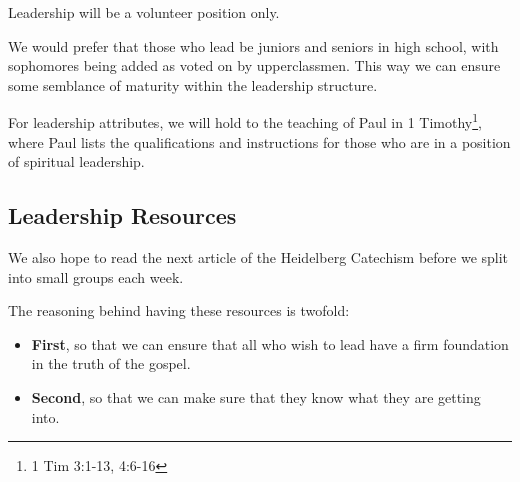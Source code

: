 \documentclass[12pt]{article}
\begin{document}
  Leadership will be a volunteer position only.

  We would prefer that those who lead be juniors and seniors in high school,
with sophomores being added as voted on by upperclassmen. This way we can ensure
some semblance of maturity within the leadership structure.

  For leadership attributes, we will hold to the teaching of Paul in
1 Timothy\footnote{1 Tim 3:1-13, 4:6-16}, where Paul lists the
qualifications and instructions for those who are in a position of spiritual
leadership.

\subsection{Leadership Resources}

%
%
%
%
%

  We also hope to read the next article of the Heidelberg Catechism before we
split into small groups each week.

  The reasoning behind having these resources is twofold:

\begin{itemize}


	\item \textbf{First}, so that we can ensure that all who wish to lead
	have a firm foundation in the truth of the gospel.

	\item \textbf{Second}, so that we can make sure that they know what they
	are getting into.

\end{itemize}
\end{document}
